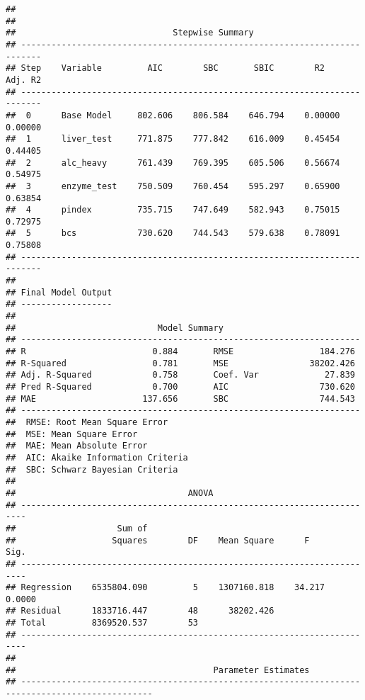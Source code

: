 \documentclass[
]{article}
\begin{document}
\begin{verbatim}
## 
## 
##                               Stepwise Summary                              
## --------------------------------------------------------------------------
## Step    Variable         AIC        SBC       SBIC        R2       Adj. R2 
## --------------------------------------------------------------------------
##  0      Base Model     802.606    806.584    646.794    0.00000    0.00000 
##  1      liver_test     771.875    777.842    616.009    0.45454    0.44405 
##  2      alc_heavy      761.439    769.395    605.506    0.56674    0.54975 
##  3      enzyme_test    750.509    760.454    595.297    0.65900    0.63854 
##  4      pindex         735.715    747.649    582.943    0.75015    0.72975 
##  5      bcs            730.620    744.543    579.638    0.78091    0.75808 
## --------------------------------------------------------------------------
## 
## Final Model Output 
## ------------------
## 
##                            Model Summary                            
## -------------------------------------------------------------------
## R                         0.884       RMSE                 184.276 
## R-Squared                 0.781       MSE                38202.426 
## Adj. R-Squared            0.758       Coef. Var             27.839 
## Pred R-Squared            0.700       AIC                  730.620 
## MAE                     137.656       SBC                  744.543 
## -------------------------------------------------------------------
##  RMSE: Root Mean Square Error 
##  MSE: Mean Square Error 
##  MAE: Mean Absolute Error 
##  AIC: Akaike Information Criteria 
##  SBC: Schwarz Bayesian Criteria 
## 
##                                  ANOVA                                  
## -----------------------------------------------------------------------
##                    Sum of                                              
##                   Squares        DF    Mean Square      F         Sig. 
## -----------------------------------------------------------------------
## Regression    6535804.090         5    1307160.818    34.217    0.0000 
## Residual      1833716.447        48      38202.426                     
## Total         8369520.537        53                                    
## -----------------------------------------------------------------------
## 
##                                       Parameter Estimates                                        
## ------------------------------------------------------------------------------------------------

\end{verbatim}
\end{document}
